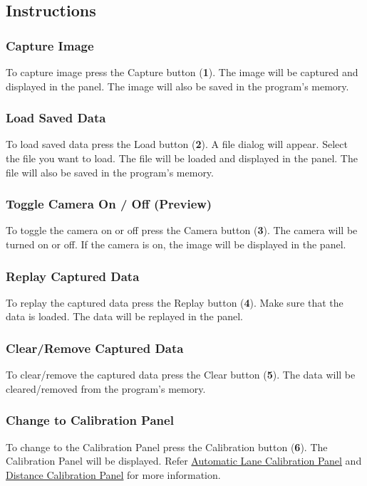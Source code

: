 \subsection{Instructions}

\subsubsection{Capture Image}
To capture image press the Capture button (\textbf{1}). The image will be captured and displayed in the panel. The image will also be saved in the program's memory.

\subsubsection{Load Saved Data}
To load saved data press the Load button (\textbf{2}). A file dialog will appear. Select the file you want to load. The file will be loaded and displayed in the panel. The file will also be saved in the program's memory.

\subsubsection{Toggle Camera On / Off (Preview)}
To toggle the camera on or off press the Camera button (\textbf{3}). The camera will be turned on or off. If the camera is on, the image will be displayed in the panel.

\subsubsection{Replay Captured Data}
To replay the captured data press the Replay button (\textbf{4}). Make sure that the data is loaded. The data will be replayed in the panel.

\subsubsection{Clear/Remove Captured Data}
To clear/remove the captured data press the Clear button (\textbf{5}). The data will be cleared/removed from the program's memory.

\subsubsection{Change to Calibration Panel}
To change to the Calibration Panel press the Calibration button (\textbf{6}). The Calibration Panel will be displayed. Refer \hyperref[sec:auto-lane-calibration-panel]{Automatic Lane Calibration Panel} and \hyperref[sec:distance-calibration-panel]{Distance Calibration Panel} for more information.

